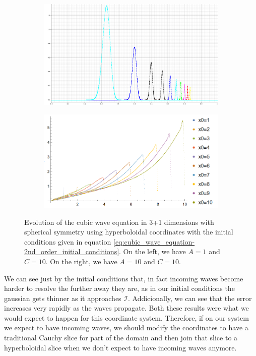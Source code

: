 \begin{figure}[h]
    \centering
    \begin{subfigure}[b]{0.45\textwidth}
        \centering
        \includegraphics[width=\textwidth]{Images/Incoming_IC.png}
    \end{subfigure}
    \hfill
    \begin{subfigure}[b]{0.45\textwidth}
        \centering
        \includegraphics[width=\textwidth]{Images/Incoming_Error.png}
    \end{subfigure}
    \caption{Evolution of the cubic wave equation in 3+1 dimensions with spherical symmetry using hyperboloidal coordinates with the initial conditions given in equation \eqref{eq:cubic_wave_equation-2nd_order_initial_conditions}. On the left, we have $A=1$ and $C=10$. On the right, we have  $A=10$ and $C=10$.}
    \label{fig:Incoming_Waves}
\end{figure}

We can see just by the initial conditions that, in fact incoming waves become harder to resolve the further away they are, as in our initial conditions the gaussian gets thinner as it approaches $\mathscr{I}$. Addicionally, we can see that the error increases very rapidly as the waves propagate. Both these results were what we would expect to happen for this coordinate system. Therefore, if on our system we expect to have incoming waves, we should modify the coordinates to have a traditional Cauchy slice for part of the domain and then join that slice to a hyperboloidal slice when we don't expect to have incoming waves anymore.
